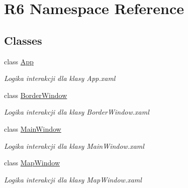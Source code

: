 \hypertarget{namespace_r6}{}\section{R6 Namespace Reference}
\label{namespace_r6}
\subsection*{Classes}
\begin{DoxyCompactItemize}
\item 
class \mbox{\hyperlink{class_r6_1_1_app}{App}}
\begin{DoxyCompactList}\small\item\em Logika interakcji dla klasy App.\+xaml \end{DoxyCompactList}\item 
class \mbox{\hyperlink{class_r6_1_1_border_window}{Border\+Window}}
\begin{DoxyCompactList}\small\item\em Logika interakcji dla klasy Border\+Window.\+xaml \end{DoxyCompactList}\item 
class \mbox{\hyperlink{class_r6_1_1_main_window}{Main\+Window}}
\begin{DoxyCompactList}\small\item\em Logika interakcji dla klasy Main\+Window.\+xaml \end{DoxyCompactList}\item 
class \mbox{\hyperlink{class_r6_1_1_map_window}{Map\+Window}}
\begin{DoxyCompactList}\small\item\em Logika interakcji dla klasy Map\+Window.\+xaml \end{DoxyCompactList}\end{DoxyCompactItemize}
